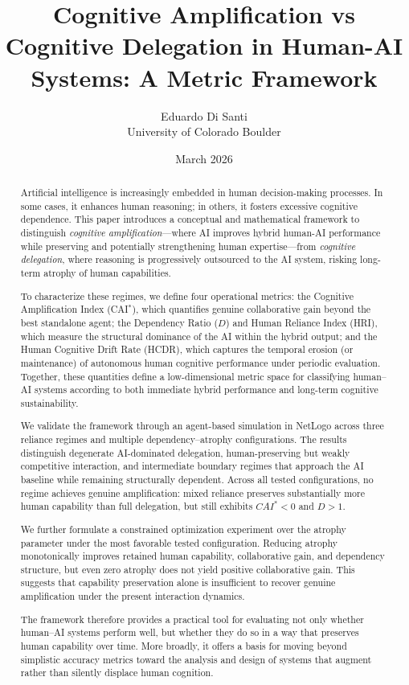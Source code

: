 \documentclass[11pt,a4paper]{article}
\title{Cognitive Amplification vs Cognitive Delegation in Human-AI Systems: A Metric Framework}
\author{Eduardo Di Santi \\
        University of Colorado Boulder}
\date{March 2026}
\begin{document}
\maketitle

\begin{abstract}
Artificial intelligence is increasingly embedded in human decision-making processes. In some cases, it enhances human reasoning; in others, it fosters excessive cognitive dependence. This paper introduces a conceptual and mathematical framework to distinguish \emph{cognitive amplification}---where AI improves hybrid human-AI performance while preserving and potentially strengthening human expertise---from \emph{cognitive delegation}, where reasoning is progressively outsourced to the AI system, risking long-term atrophy of human capabilities.

To characterize these regimes, we define four operational metrics: the Cognitive Amplification Index (CAI$^*$), which quantifies genuine collaborative gain beyond the best standalone agent; the Dependency Ratio ($D$) and Human Reliance Index (HRI), which measure the structural dominance of the AI within the hybrid output; and the Human Cognitive Drift Rate (HCDR), which captures the temporal erosion (or maintenance) of autonomous human cognitive performance under periodic evaluation. Together, these quantities define a low-dimensional metric space for classifying human--AI systems according to both immediate hybrid performance and long-term cognitive sustainability.

We validate the framework through an agent-based simulation in NetLogo across three reliance regimes and multiple dependency--atrophy configurations. The results distinguish degenerate AI-dominated delegation, human-preserving but weakly competitive interaction, and intermediate boundary regimes that approach the AI baseline while remaining structurally dependent. Across all tested configurations, no regime achieves genuine amplification: mixed reliance preserves substantially more human capability than full delegation, but still exhibits $CAI^* < 0$ and $D > 1$.

We further formulate a constrained optimization experiment over the atrophy parameter under the most favorable tested configuration. Reducing atrophy monotonically improves retained human capability, collaborative gain, and dependency structure, but even zero atrophy does not yield positive collaborative gain. This suggests that capability preservation alone is insufficient to recover genuine amplification under the present interaction dynamics.

The framework therefore provides a practical tool for evaluating not only whether human--AI systems perform well, but whether they do so in a way that preserves human capability over time. More broadly, it offers a basis for moving beyond simplistic accuracy metrics toward the analysis and design of systems that augment rather than silently displace human cognition.
\end{abstract}
\end{document}
